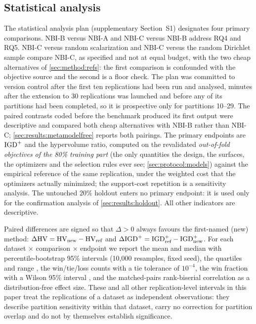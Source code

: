 \subsection{Statistical analysis}
\label{sec:protocol:stats}

The statistical analysis plan (supplementary Section~S1) designates four primary comparisons. NBI-B versus NBI-A and
NBI-C versus NBI-B address RQ4 and RQ5. NBI-C versus random scalarization and NBI-C versus the random Dirichlet sample
compare NBI-C, as specified and not at equal budget, with the two cheap alternatives of \cref{sec:method:refs}: the
first comparison is confounded with the objective source and the second is a floor check. The plan was committed to
version control after the first ten replications had been run and analysed, minutes after the extension to 30
replications was launched and before any of its partitions had been completed, so it is prospective only for
partitions 10--29. The paired contrasts coded before the benchmark produced its first output were descriptive and
compared both cheap alternatives with NBI-B rather than NBI-C; \cref{sec:results:metamodelfree} reports both
pairings. The
primary endpoints are $\mathrm{IGD}^{+}$ and the hypervolume ratio, computed on the revalidated \emph{out-of-fold objectives of
the 80\% training part} (the only quantities the design, the surfaces, the optimizers and the selection rules ever
see; \cref{sec:protocol:models}) against the empirical reference of the same replication, under the weighted cost
that the optimizers actually minimized; the support-cost repetition is a sensitivity analysis. The
untouched 20\% holdout enters no primary endpoint: it is used only for the confirmation analysis of
\cref{sec:results:holdout}. All other indicators are descriptive.

Paired differences are signed so that $\Delta > 0$ always favours the first-named (new) method:
$\Delta\mathrm{HV} = \mathrm{HV}_{\text{new}} - \mathrm{HV}_{\text{ref}}$ and
$\Delta\mathrm{IGD}^{+} = \mathrm{IGD}^{+}_{\text{ref}} - \mathrm{IGD}^{+}_{\text{new}}$. For each dataset $\times$ comparison $\times$ endpoint we
report the mean and median with percentile-bootstrap 95\% intervals (10{,}000 resamples, fixed seed), the quartiles
and range \citep{efron1993bootstrap}, the win/tie/loss counts with a tie tolerance of $10^{-4}$, the win fraction
with a Wilson 95\% interval \citep{wilson1927probable}, and the matched-pairs rank-biserial correlation
\citep{kerby2014simple} as a distribution-free effect size. These and all other replication-level intervals in this
paper treat the replications of a dataset as independent observations: they describe partition sensitivity within
that dataset, carry no correction for partition overlap and do not by themselves establish significance.

